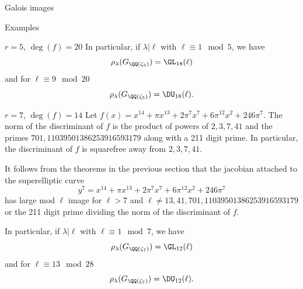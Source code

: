 \documentclass[11pt,a4paper]{article}
\newcommand{\Gcyclo}[1]{G_{\QQ(\zeta_{#1})}}
\begin{document}
\begin{section}{Galois images}
\begin{subsection}{Examples}
\begin{subsubsection}{$r=5$, $\deg(f) = 20$}
In particular, if $\lambda|\ell$ with $\ell \equiv 1 \mod{5}$, we have \[\rho_\lambda(\Gcyclo{5})=\GL_{18}(\ell)\]
and for $\ell \equiv 9 \mod{20}$
\[\rho_\lambda(\Gcyclo{5})=\DU_{18}(\ell).\]
\end{subsubsection}
\begin{subsubsection}{$r=7$, $\deg(f) = 14$}
Let $f(x) = x^{14}+ \pi x^{13} + 2\pi^7 x^7 + 6\pi^{12}x^2 + 246\pi^7$. The norm of the discriminant of $f$ is the product of powers of $2,3,7,41$ and the primes $701, 11039501386253916593179$ along with a 211 digit prime. In particular, the discriminant of $f$ is squarefree away from $2,3,7,41$.

It follows from the theorems in the previous section that the jacobian attached to the superelliptic curve
\[ y^7 = x^{14} + \pi x^{13} + 2\pi^7 x^7 + 6\pi^{12} x^2 + 246\pi^7
\]
has large mod $\ell$ image for $\ell > 7$ and $\ell \neq 13, 41, 701, 11039501386253916593179$ or the 211 digit prime dividing the norm of the discriminant of $f$.

In particular, if $\lambda|\ell$ with $\ell \equiv 1 \mod{7}$, we have \[\rho_\lambda(\Gcyclo{7})=\GL_{12}(\ell)\]
and for $\ell \equiv 13 \mod{28}$
\[\rho_\lambda(\Gcyclo{7})=\DU_{12}(\ell).\]
\end{subsubsection}
\end{subsection}

\end{section}
\end{document}
